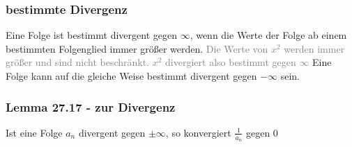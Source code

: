 \documentclass{report}
\begin{document}
		\subsubsection{bestimmte Divergenz}
			Eine Folge ist bestimmt divergent gegen $\infty$, wenn die Werte der Folge ab einem bestimmten Folgenglied immer größer werden. \textcolor{gray}{Die Werte von $x^2$ werden immer größer und sind nicht beschränkt. $x^2$ divergiert also bestimmt gegen $\infty$}
			Eine Folge kann auf die gleiche Weise bestimmt divergent gegen $-\infty$ sein.
		\subsubsection{Lemma 27.17 - zur Divergenz}
			Ist eine Folge $a_n$ divergent gegen $\pm \infty$, so konvergiert $\frac1{a_n}$ gegen 0\\
	
\end{document}

